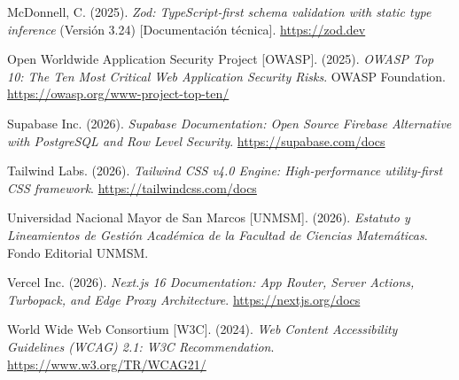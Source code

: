 \documentclass[12pt,a4paper,oneside]{report}
\begin{document}
\noindent
McDonnell, C. (2025). \textit{Zod: TypeScript-first schema validation with static type inference} (Versión 3.24) [Documentación técnica]. \url{https://zod.dev}

\noindent
Open Worldwide Application Security Project [OWASP]. (2025). \textit{OWASP Top 10: The Ten Most Critical Web Application Security Risks}. OWASP Foundation. \url{https://owasp.org/www-project-top-ten/}

\noindent
Supabase Inc. (2026). \textit{Supabase Documentation: Open Source Firebase Alternative with PostgreSQL and Row Level Security}. \url{https://supabase.com/docs}

\noindent
Tailwind Labs. (2026). \textit{Tailwind CSS v4.0 Engine: High-performance utility-first CSS framework}. \url{https://tailwindcss.com/docs}

\noindent
Universidad Nacional Mayor de San Marcos [UNMSM]. (2026). \textit{Estatuto y Lineamientos de Gestión Académica de la Facultad de Ciencias Matemáticas}. Fondo Editorial UNMSM.

\noindent
Vercel Inc. (2026). \textit{Next.js 16 Documentation: App Router, Server Actions, Turbopack, and Edge Proxy Architecture}. \url{https://nextjs.org/docs}

\noindent
World Wide Web Consortium [W3C]. (2024). \textit{Web Content Accessibility Guidelines (WCAG) 2.1: W3C Recommendation}. \url{https://www.w3.org/TR/WCAG21/}

\endgroup
\end{document}
